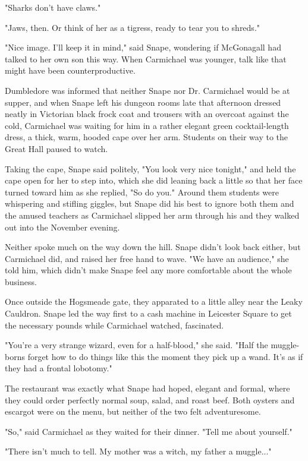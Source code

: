 \documentclass[a4paper,11pt]{article}
\begin{document}
"Sharks don't have claws."

"Jaws, then. Or think of her as a tigress, ready to tear you to shreds."

"Nice image. I'll keep it in mind," said Snape, wondering if McGonagall had talked to her own son this way. When Carmichael was younger, talk like that might have been counterproductive.

Dumbledore was informed that neither Snape nor Dr. Carmichael would be at supper, and when Snape left his dungeon rooms late that afternoon dressed neatly in Victorian black frock coat and trousers with an overcoat against the cold, Carmichael was waiting for him in a rather elegant green cocktail-length dress, a thick, warm, hooded cape over her arm. Students on their way to the Great Hall paused to watch.

Taking the cape, Snape said politely, "You look very nice tonight," and held the cape open for her to step into, which she did leaning back a little so that her face turned toward him as she replied, "So do you." Around them students were whispering and stifling giggles, but Snape did his best to ignore both them and the amused teachers as Carmichael slipped her arm through his and they walked out into the November evening.

Neither spoke much on the way down the hill. Snape didn't look back either, but Carmichael did, and raised her free hand to wave. "We have an audience," she told him, which didn't make Snape feel any more comfortable about the whole business.

Once outside the Hogsmeade gate, they apparated to a little alley near the Leaky Cauldron. Snape led the way first to a cash machine in Leicester Square to get the necessary pounds while Carmichael watched, fascinated.

"You're a very strange wizard, even for a half-blood," she said. "Half the muggle-borns forget how to do things like this the moment they pick up a wand. It's as if they had a frontal lobotomy."

The restaurant was exactly what Snape had hoped, elegant and formal, where they could order perfectly normal soup, salad, and roast beef. Both oysters and escargot were on the menu, but neither of the two felt adventuresome.

"So," said Carmichael as they waited for their dinner. "Tell me about yourself."

"There isn't much to tell. My mother was a witch, my father a muggle..."
\end{document}
